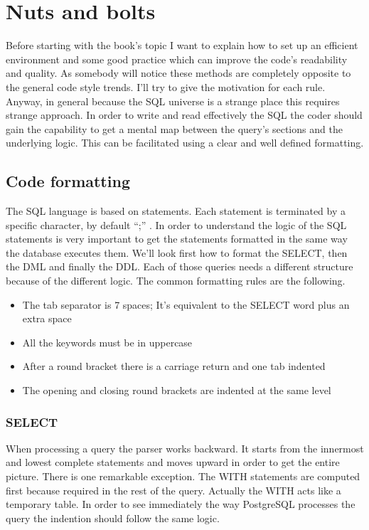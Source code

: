 \chapter{Nuts and bolts}
Before starting with the book's topic I want to explain how to set up an
efficient environment and some good practice which can improve the code's readability and quality.
As somebody will notice these methods are completely opposite to the general code style trends. I'll 
try to give the motivation for each rule. Anyway, in general because the SQL universe is a strange 
place this requires strange approach. In order to write and read effectively the SQL the coder should gain 
the capability to get a mental map  between the query's sections and the underlying logic. This can be 
facilitated using a clear and well defined formatting.\newline

\section{Code formatting}
The SQL language is based on statements. Each statement is terminated by a specific character, by default ``;'' . 
In order to understand the logic of the SQL statements is very important to get the statements formatted in the same 
way the database executes them. We'll look first how to format the SELECT, then the DML and finally the DDL. Each of 
those queries needs a different structure because of the different logic. The common formatting rules are the following.

\begin{itemize}
 \item The tab separator is 7 spaces; It's equivalent to the SELECT word plus an extra space
 \item All the keywords must be in uppercase
 \item After a round bracket there is a carriage return and one tab indented 
 \item The opening and closing round brackets are indented at the same level
\end{itemize}



\subsection{SELECT}
When processing a query the parser works backward. It starts from the innermost and lowest complete statements and 
moves upward in order to get the entire picture. There is one remarkable exception. The WITH statements are computed 
first because required in the rest of the query. Actually the WITH acts like a temporary table. In order to see 
immediately the way PostgreSQL processes the query the indention should follow the same logic. \newline

